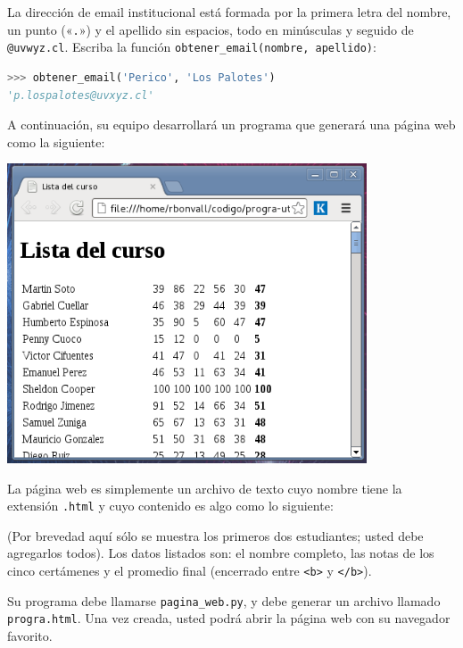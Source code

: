 \newpage
\begin{certamen}[leftmargin=0pt]

  \item
    La dirección de email institucional
    está formada por
    la primera letra del nombre, un punto («\verb+.+»)
    y el apellido sin espacios,
    todo en minúsculas y seguido de \verb+@uvwyz.cl+.
    Escriba la función \verb!obtener_email(nombre, apellido)!:
\begin{lstlisting}[language=py,frame=none]
>>> obtener_email('Perico', 'Los Palotes')
'p.lospalotes@uvxyz.cl'
\end{lstlisting}

  \newpage
  \item
    A continuación,
    su equipo desarrollará un programa
    que gene\-rará una página web como la siguiente:

    \includegraphics[width=0.8\textwidth]{curso-varias/pagina.png}

    La página web es simplemente un archivo de texto
    cuyo nombre tiene la extensión \texttt{.html}
    y cuyo contenido es algo como lo siguiente:

    

    (Por brevedad aquí sólo se muestra los primeros dos estu\-diantes;
    usted debe agregarlos todos).
    Los datos listados son:
    el nombre completo,
    las notas de los cinco certámenes
    y el promedio final (encerrado entre \verb+<b>+ y \verb+</b>+).

    Su programa debe llamarse \texttt{pagina\_web.py},
    y debe generar un archivo llamado \texttt{progra.html}.
    Una vez creada,
    usted podrá abrir la página web con su navegador favorito.


\end{certamen}
